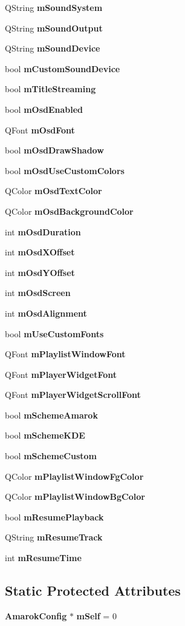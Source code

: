 \begin{CompactItemize}
QString {\bf m\-Sound\-System}
\item 
QString {\bf m\-Sound\-Output}
\item 
QString {\bf m\-Sound\-Device}
\item 
bool {\bf m\-Custom\-Sound\-Device}
\item 
bool {\bf m\-Title\-Streaming}
\item 
bool {\bf m\-Osd\-Enabled}
\item 
QFont {\bf m\-Osd\-Font}
\item 
bool {\bf m\-Osd\-Draw\-Shadow}
\item 
bool {\bf m\-Osd\-Use\-Custom\-Colors}
\item 
QColor {\bf m\-Osd\-Text\-Color}
\item 
QColor {\bf m\-Osd\-Background\-Color}
\item 
int {\bf m\-Osd\-Duration}
\item 
int {\bf m\-Osd\-XOffset}
\item 
int {\bf m\-Osd\-YOffset}
\item 
int {\bf m\-Osd\-Screen}
\item 
int {\bf m\-Osd\-Alignment}
\item 
bool {\bf m\-Use\-Custom\-Fonts}
\item 
QFont {\bf m\-Playlist\-Window\-Font}
\item 
QFont {\bf m\-Player\-Widget\-Font}
\item 
QFont {\bf m\-Player\-Widget\-Scroll\-Font}
\item 
bool {\bf m\-Scheme\-Amarok}
\item 
bool {\bf m\-Scheme\-KDE}
\item 
bool {\bf m\-Scheme\-Custom}
\item 
QColor {\bf m\-Playlist\-Window\-Fg\-Color}
\item 
QColor {\bf m\-Playlist\-Window\-Bg\-Color}
\item 
bool {\bf m\-Resume\-Playback}
\item 
QString {\bf m\-Resume\-Track}
\item 
int {\bf m\-Resume\-Time}
\end{CompactItemize}
\subsection*{Static Protected Attributes}
\begin{CompactItemize}
\item 
{\bf Amarok\-Config} $\ast$ {\bf m\-Self} = 0
\end{CompactItemize}


